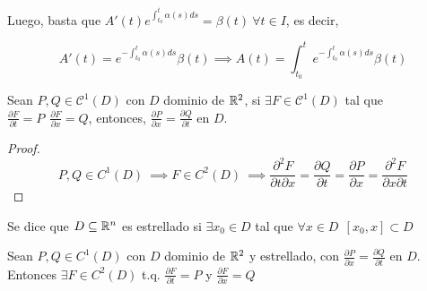  Luego, basta que $A'(t)e^{\int_{t_0}^t \alpha(s) ds} = \beta(t) \ \forall t \in I$, es decir,

 \[
 A'(t) = e^{-\int_{t_0}^t \alpha(s) ds}\beta(t) \implies A(t) = \int_{t_0}^t e^{-\int_{t_0}^t \alpha(s) ds}\beta(t)
 \]



\begin{nprop}
Sean $P,Q \in \mathscr{C}^1(D)$ con $D$ dominio de $\mathbb{R}^2$, si $\exists F\in \mathscr{C}^1 (D)$ tal que $\frac{\partial F}{\partial t} = P \ \ \frac{\partial F}{\partial x} = Q$, entonces, $\frac{\partial P}{\partial x} = \frac{\partial Q}{\partial t}$ en $D$.
\end{nprop}

\begin{proof}
\[
P,Q \in C^1 (D) \ \implies F \in C^2 (D) \ \implies \frac{\partial ^2 F}{\partial t \partial x} = \frac{\partial Q}{\partial t} = \frac{\partial P}{\partial x} = \frac{\partial ^2 F}{\partial x \partial t}
\]
\end{proof}

\begin{ndef}
Se dice que $D \subseteq \mathbb{R} ^n$ es estrellado si $\exists x_0 \in D$ tal que $\forall x \in D \ \ [x_0, x] \subset D$
\end{ndef}

\begin{nth}
Sean $P,Q \in C^1(D)$ con $D$ dominio de $\mathbb{R}^2$ y estrellado, con $\frac{\partial P}{\partial x} = \frac{\partial Q}{\partial t}$ en $D$.
Entonces $\exists F \in C^2 (D)$ t.q. $\frac{\partial F}{\partial t} = P$ y $\frac{\partial F}{\partial x} = Q$
\end{nth}

